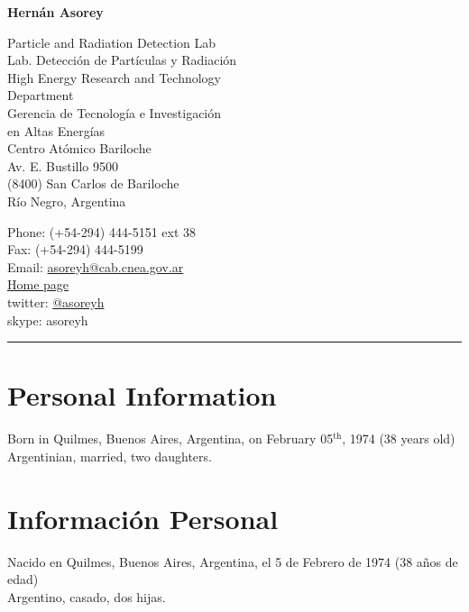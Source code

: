 \begin{center}{\huge \bf Hernán Asorey}\\[1cm]\end{center}
\begin{minipage}[t]{0.495\textwidth}
\ifeng
  Particle and Radiation Detection Lab\\
\else
  Lab. Detección de Partículas y Radiación\\
\fi
\ifeng
  High Energy Research and Technology \\
  Department\\
\else
  Gerencia de Tecnología e Investigación \\
  en Altas Energías\\
\fi
  Centro Atómico Bariloche\\
  Av. E. Bustillo 9500\\
  (8400) San Carlos de Bariloche\\
  Río Negro, Argentina\\[.2cm]
\end{minipage}
\begin{minipage}[t]{0.495\textwidth}
  Phone: (+54-294) 444-5151 ext 38\\
  Fax: (+54-294) 444-5199\\
  Email: \href{mailto:asoreyh@cab.cnea.gov.ar}{asoreyh@cab.cnea.gov.ar}\\
  \href{http://fisica.cab.cnea.gov.ar/particulas/wiki/User:Asoreyh}{Home page}\\
  twitter: \href{https://twitter.com/#!/asoreyh}{@asoreyh}\\
  skype: asoreyh\\
\end{minipage}
\hrule
\ifeng
\section*{Personal Information}
Born in Quilmes, Buenos Aires, Argentina, on February 05$^\mathrm{th}$, 1974 (38 years old)\\
Argentinian, married, two daughters.
\else
\section*{Información Personal}
Nacido en Quilmes, Buenos Aires, Argentina, el 5 de Febrero de 1974 (38 años de edad)\\
Argentino, casado, dos hijas.
\fi
